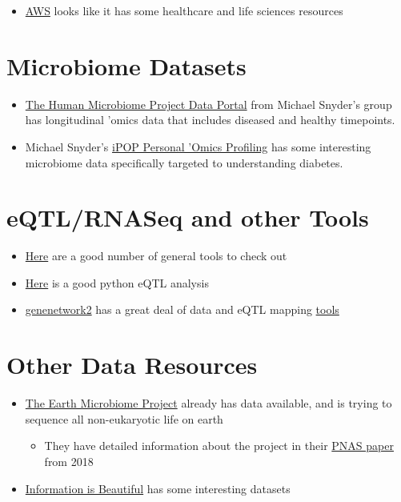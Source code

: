 \documentclass[]{book}
\providecommand{\tightlist}{%
  \setlength{\itemsep}{0pt}\setlength{\parskip}{0pt}}
\begin{document}
\begin{itemize}
\tightlist
\item
  \href{https://aws.amazon.com/health/}{AWS} looks like it has some
  healthcare and life sciences resources
\end{itemize}

\section{Microbiome Datasets}\label{microbiome-datasets}

\begin{itemize}
\tightlist
\item
  \href{https://portal.hmpdacc.org/}{The Human Microbiome Project Data
  Portal} from Michael Snyder's group has longitudinal 'omics data that
  includes diseased and healthy timepoints.
\item
  Michael Snyder's \href{http://med.stanford.edu/ipop.html}{iPOP
  Personal 'Omics Profiling} has some interesting microbiome data
  specifically targeted to understanding diabetes.
\end{itemize}

\section{eQTL/RNASeq and other Tools}\label{eqtlrnaseq-and-other-tools}

\begin{itemize}
\tightlist
\item
  \href{https://adinasarapu.github.io/year-archive/}{Here} are a good
  number of general tools to check out
\item
  \href{https://github.com/molgenis/systemsgenetics/wiki/eQTL-mapping-analysis-cookbook-for-RNA-seq-data}{Here}
  is a good python eQTL analysis
\item
  \href{http://gn2.genenetwork.org/}{genenetwork2} has a great deal of
  data and eQTL mapping
  \href{https://github.com/genenetwork/genenetwork2}{tools}
\end{itemize}

\section{Other Data Resources}\label{other-data-resources}

\begin{itemize}
\tightlist
\item
  \href{http://www.earthmicrobiome.org/data-and-code/}{The Earth
  Microbiome Project} already has data available, and is trying to
  sequence all non-eukaryotic life on earth

  \begin{itemize}
  \tightlist
  \item
    They have detailed information about the project in their
    \href{http://www.pnas.org/content/115/17/4325.long}{PNAS paper} from
    2018
  \end{itemize}
\item
  \href{https://informationisbeautiful.net/}{Information is Beautiful}
  has some interesting datasets
\end{itemize}
\end{document}
